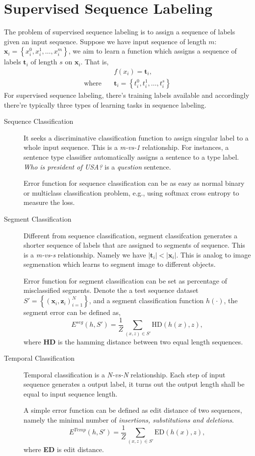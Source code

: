\documentclass{article}
\newcommand{\vct}[1]{\ensuremath{\boldsymbol{#1}}} %
\begin{document}
\section{Supervised Sequence Labeling}
The problem of supervised sequence labeling \cite{Graves2013} is to assign a sequence of labels given an input sequence. Suppose we have input sequence of length $ m $: $ \vct x_i = \left\lbrace x_i^{0}, x_i^{1}, \ldots, x_i^{m}\right\rbrace $, we aim to learn a function which assigns a sequence of labels $ \vct t_i $ of length $ s $ on $ \vct x_i $. That is, 
\begin{align*}
& f(x_i)  = \vct t_i, \\
\text{where} \quad & \vct t_i = \left\lbrace t_i^{0}, t_i^{1}, \ldots, t_i^{s}\right\rbrace
\end{align*}                 
For supervised sequence labeling, there's training labels available and accordingly there're
typically three types of learning tasks in sequence labeling.

\begin{description}
	\item[Sequence Classification] 
	It seeks a discriminative classification function to assign 
	singular label to a whole input sequence. This is a \textit{m-vs-1} relationship.
	For instances, a sentence type classifier automatically assigns a sentence to a type
	label. \textit{Who is president of USA?} is a \textit{question} sentence. 

	Error function for sequence classification can be as easy as normal binary or multiclass
	classification problem, e.g., using softmax cross entropy to measure the loss. 
	
	\item[Segment Classification] 
	Different from sequence classification, segment classifcation generates a shorter sequence 
	of labels that are assigned to segments of sequence. This is a \textit{m-vs-s} relationship.
	Namely we have $ | \vct t_i | < | \vct x_i |$. This is analog to image segmenation which 
	learns to segment image to different objects.
	
	Error function for segment classification can be set as percentage of misclassified segments.
	Denote the a test sequence dataset $S' = \left\lbrace (\vct x_i, \vct z_i)_{i=1}^N \right\rbrace$,
	and a segment classification function $h(\cdot)$, the segment error can be defined as, 
	\[
		E^{seg}(h, S') = \frac{1}{Z}\sum_{(x,z)\in S'} \text{HD}(h(x), z),
	\]
	where \textbf{HD} is the hamming distance between two equal length sequences.

	\item[Temporal Classification] 
	Temporal classification is a \textit{N-vs-N} relationship. Each step of input sequence 
	generates a output label, it turns out the output length shall be equal to input sequence
	length. 

	A simple error function can be defined as edit distance of two sequences, namely the minimal
	number of \textit{insertions, substitutions and deletions}. 
	\[
		E^{Temp}(h, S') = \frac{1}{Z}\sum_{(x,z)\in S'} \text{ED}(h(x), z),
	\]
	where \textbf{ED} is edit distance. 

\end{description}
\end{document}
